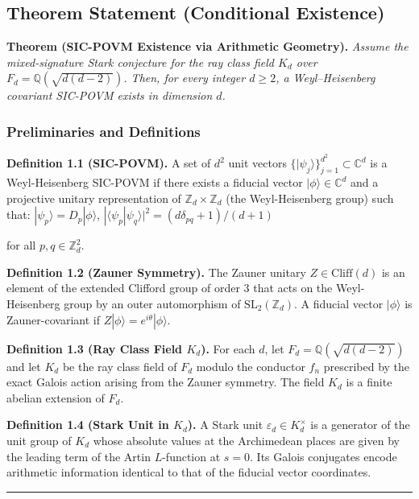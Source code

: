 \documentclass[12pt,a4paper]{article}
\begin{document}
\subsection{Theorem Statement (Conditional Existence)}

\textbf{Theorem (SIC-POVM Existence via Arithmetic Geometry).} \emph{Assume the mixed-signature Stark conjecture for the ray class field $K_d$ over $F_d = \mathbb{Q}(\sqrt{d(d-2)})$. Then, for every integer $d \geq 2$, a Weyl--Heisenberg covariant SIC-POVM exists in dimension $d$.}

\subsubsection{Preliminaries and Definitions}

\textbf{Definition 1.1 (SIC-POVM).} A set of $d^2$ unit vectors $\{|\psi_j\rangle\}_{j=1}^{d^2} \subset \mathbb{C}^d$ is a Weyl-Heisenberg SIC-POVM if there exists a fiducial vector $|\phi\rangle \in \mathbb{C}^d$ and a projective unitary representation of $\mathbb{Z}_d \times \mathbb{Z}_d$ (the Weyl-Heisenberg group) such that: $|\psi_p\rangle = D_p |\phi\rangle$, $|\langle\psi_p | \psi_q\rangle|^2 = (d \delta_{pq} + 1)/(d+1)$

for all $p, q \in \mathbb{Z}_d^2$.

\textbf{Definition 1.2 (Zauner Symmetry).} The Zauner unitary $Z \in \text{Cliff}(d)$ is an element of the extended Clifford group of order $3$ that acts on the Weyl-Heisenberg group by an outer automorphism of $\text{SL}_2(\mathbb{Z}_d)$. A fiducial vector $|\phi\rangle$ is Zauner-covariant if $Z|\phi\rangle = e^{i\theta}|\phi\rangle$.

\textbf{Definition 1.3 (Ray Class Field $K_d$).} For each $d$, let $F_d = \mathbb{Q}(\sqrt{d(d-2)})$ and let $K_d$ be the ray class field of $F_d$ modulo the conductor $f_n$ prescribed by the exact Galois action arising from the Zauner symmetry. The field $K_d$ is a finite abelian extension of $F_d$.

\textbf{Definition 1.4 (Stark Unit in $K_d$).} A Stark unit $\varepsilon_d \in K_d^\times$ is a generator of the unit group of $K_d$ whose absolute values at the Archimedean places are given by the leading term of the Artin $L$-function at $s=0$. Its Galois conjugates encode arithmetic information identical to that of the fiducial vector coordinates.

\begin{center}
\rule{0.5\textwidth}{0.4pt}
\end{center}
\end{document}
